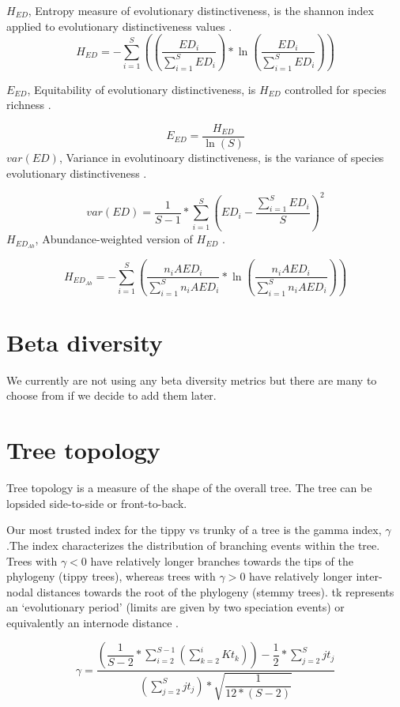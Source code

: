 \documentclass[]{book}
\theoremstyle{definition}
\theoremstyle{definition}
\theoremstyle{remark}
\begin{document}
\(H_{ED}\), Entropy measure of evolutionary distinctiveness, is the
shannon index applied to evolutionary distinctiveness values
\citep{Cadotte2010}. \[
H_{ED} = -\sum_{i=1}^{S}
((\dfrac{ED_{i}}{\sum_{i=1}^{S} ED_{i}})
* \ln (\dfrac{ED_{i}}{\sum_{i=1}^{S} ED_{i}}))
\]

\(E_{ED}\), Equitability of evolutionary distinctiveness, is \(H_{ED}\)
controlled for species richness \citep{Cadotte2010}.

\[
E_{ED} = \dfrac{H_{ED}}{\ln(S)}
\] \(var(ED)\), Variance in evolutinoary distinctiveness, is the
variance of species evolutionary distinctiveness \citep{Tucker2016}.

\[
var(ED) = \dfrac{1}{S-1} *
\sum_{i=1}^{S}
(ED_{i}-\dfrac{\sum_{i=1}^{S} ED_{i}}{S})^2
\] \(H_{ED_{Ab}}\), Abundance-weighted version of \(H_{ED}\)
\citep{Cadotte2010}.

\[
H_{ED_{Ab}} = -\sum_{i=1}^{S}
(\dfrac{n_{i}AED_{i}}{\sum_{i=1}^{S} n_{i}AED_{i}} *
\ln(\dfrac{n_{i}AED_{i}}{\sum_{i=1}^{S} n_{i}AED_{i}}))
\]

\hypertarget{beta-diversity}{\section{Beta
diversity}\label{beta-diversity}}

We currently are not using any beta diversity metrics but there are many
to choose from if we decide to add them later.

\hypertarget{tree-topology}{\section{Tree
topology}\label{tree-topology}}

Tree topology is a measure of the shape of the overall tree. The tree
can be lopsided side-to-side or front-to-back.

Our most trusted index for the tippy vs trunky of a tree is the gamma
index, \(\gamma\).The index characterizes the distribution of branching
events within the tree. Trees with \(\gamma < 0\) have relatively longer
branches towards the tips of the phylogeny (tippy trees), whereas trees
with \(\gamma > 0\) have relatively longer inter-nodal distances towards
the root of the phylogeny (stemmy trees). tk represents an `evolutionary
period' (limits are given by two speciation events) or equivalently an
internode distance \citep{Pybus2000}.

\[
  \gamma = \dfrac
  {(\dfrac{1}{S-2}* \sum_{i=2}^{S-1} (\sum_{k=2}^{i} Kt_{k}))- \dfrac{1}{2} * \sum_{j=2}^{S} jt_{j}}
  {(\sum_{j=2}^{S} jt_{j}) * \sqrt{\dfrac{1}{12*(S-2)}}}
\]
\end{document}
